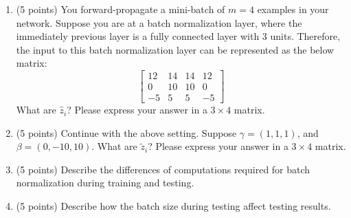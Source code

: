 \documentclass[11pt]{article}
\begin{document}
\begin{enumerate}
    \begin{enumerate}
    \item (5 points) You forward-propagate a mini-batch of $m=4$ examples in your
    network. Suppose you are at a batch normalization layer, where the
    immediately previous layer is a fully connected layer with $3$
    units. Therefore, the input to this batch normalization layer can be
    represented as the below matrix:
    $$\begin{bmatrix}
    12&14&14&12\\
    0&10&10&0\\
    -5&5&5&-5
    \end{bmatrix}$$ What are $\hat z_i$? Please express your answer in a
    $3\times 4$ matrix.
    
    
    \item (5 points) Continue with the above setting. Suppose
    $\gamma=(1,1,1)$, and $\beta=(0,-10,10)$. What are $\tilde
    z_i$? Please express your answer in a $3\times 4$ matrix.

    
    \item (5 points) Describe the differences of computations required for batch normalization
    during training and testing.
    
    
    \item (5 points) Describe how the batch size during testing affect testing
    results.
    
    \end{enumerate}
    

\end{enumerate}
\end{document}
